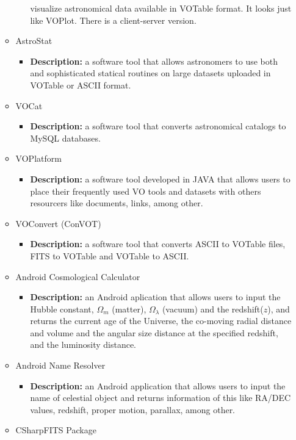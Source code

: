 \begin{itemize}
\begin{itemize}
\begin{itemize}
visualize astronomical data available in VOTable format. It looks just like
VOPlot. There is a client-server version.
\end{itemize}
\item AstroStat
\begin{itemize}
\item \textbf{Description:} a software tool that allows astronomers to use both
and sophisticated statical routines on large datasets uploaded in VOTable or
ASCII format.
\end{itemize}
\item VOCat
\begin{itemize}
\item \textbf{Description:} a software tool that converts astronomical catalogs
to MySQL databases. 
\end{itemize}
\item VOPlatform
\begin{itemize}
\item \textbf{Description:} a software tool developed in JAVA that allows users
to place their frequently used VO tools and datasets with others resourcers like
documents, links, among other.
\end{itemize}
\item VOConvert (ConVOT)
\begin{itemize}
\item \textbf{Description:} a software tool that converts ASCII to VOTable
files, FITS to VOTable and VOTable to ASCII.
\end{itemize}
\item Android Cosmological Calculator
\begin{itemize}
\item \textbf{Description:} an Android aplication that allows users to input the
Hubble constant, $ \Omega_{m} $ (matter), $ \Omega_{\lambda} $ (vacuum) and the
redshift($ z $), and returns the current age of the Universe, the co-moving
radial distance and volume and the angular size distance at the specified
redshift, and the luminosity distance.
\end{itemize}
\item Android Name Resolver
\begin{itemize}
\item \textbf{Description:} an Android application that allows users to input
the name of celestial object and returns information of this like RA/DEC values,
redshift, proper motion, parallax, among other.
\end{itemize}
\item CSharpFITS Package

\end{itemize}
\end{itemize}

